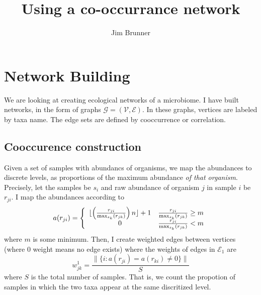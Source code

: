 \documentclass[10pt]{article}
\author{Jim Brunner}
\title{Using a co-occurrance network}
\theoremstyle{definition}
\numberwithin{theorem}{section}
\numberwithin{definition}{section}
\numberwithin{lemma}{section}
\numberwithin{corollary}{section}
\numberwithin{clm}{section}
\numberwithin{rmk}{section}
\newcommand{\cE}{\mathcal{E}}
\newcommand{\cG}{\mathcal{G}}
\newcommand{\cV}{\mathcal{V}}
\begin{document}
\maketitle
\section{Network Building}
We are looking at creating ecological networks of a microbiome. I have built networks, in the form of graphs $\cG = (\cV, \cE)$. In these graphs, vertices are labeled by taxa name. The edge sets are defined by cooccurrence or correlation.

\subsection{Cooccurence construction}
Given a set of samples with abundancs of organisms, we map the abundances to discrete levels, as proportions of the maximum abundance \emph{of that organism}. Precisely, let the samples be $s_i$ and raw abundance of organism $j$ in sample $i$ be $r_{ji}$. I map the abundances according to
\[
a(r_{ji})  = \left\{
\begin{array}{c c}
\lfloor\left(\frac{r_{ji}}{\max_{s_k}(r_{jk})}\right) n \rfloor + 1 &  \frac{r_{ji}}{\max_{s_k}(r_{jk})} \geq m \\
0 & \frac{r_{ji}}{\max_{s_k}(r_{jk})} < m
\end{array}
\right.
\]
where $m$ is some minimum. Then, I create weighted edges between vertices (where $0$ weight means no edge exists) where the weights of edges in $\cE_1$ are
\[
w^1_{jk} = \frac{\|\{i: a(r_{ji}) = a(r_{ki}) \neq 0\} \|}{S}
\]
where $S$ is the total number of samples. That is, we count the propotion of samples in which the two taxa appear at the same discritized level. 
\end{document}
